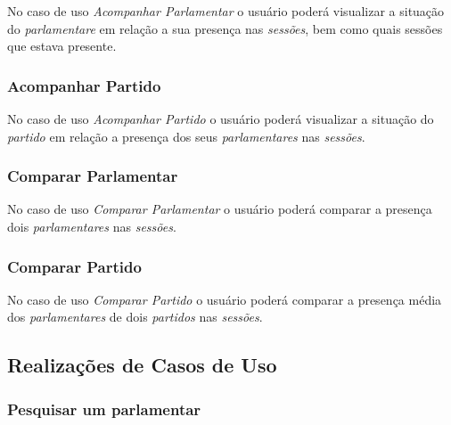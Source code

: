 	No caso de uso \textit{Acompanhar Parlamentar} o usuário poderá visualizar a situação do \textit{parlamentare} em relação a sua presença nas \textit{sessões}, bem como quais sessões que estava presente.

	\subsubsection{Acompanhar Partido}

	No caso de uso \textit{Acompanhar Partido} o usuário poderá visualizar a situação do \textit{partido} em relação a presença dos seus \textit{parlamentares} nas \textit{sessões}.

	\subsubsection{Comparar Parlamentar}

	No caso de uso \textit{Comparar Parlamentar} o usuário poderá comparar a presença dois \textit{parlamentares} nas \textit{sessões}.

	\subsubsection{Comparar Partido}

	No caso de uso \textit{Comparar Partido} o usuário poderá comparar a presença média dos \textit{parlamentares} de dois \textit{partidos} nas \textit{sessões}.	

\subsection{Realizações de Casos de Uso}
	
	\subsubsection{Pesquisar um parlamentar}

